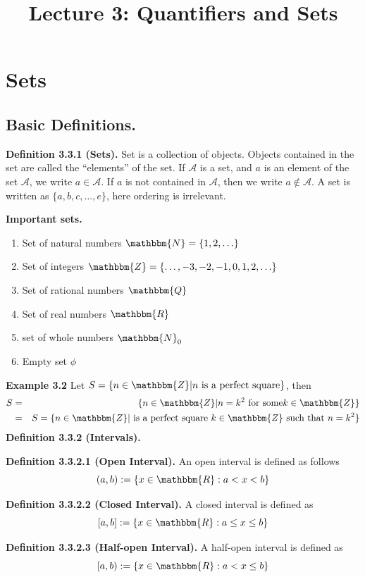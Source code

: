 \documentclass[a4paper,english,12pt]{article}
\title{ Lecture 3: Quantifiers and Sets}
\begin{document}
\maketitle

\section{Sets}
\subsection{Basic Definitions.}
\textbf{Definition 3.3.1 (Sets).} Set is a collection of objects. Objects contained in the set are called the ``elements'' of the set. If $\mathcal{A}$ is a set, and $a$ is an element of the set $\mathcal{A}$, we write $a\in \mathcal{A}$. If $a$ is not contained in $\mathcal{A}$, then we write $a\notin\mathcal{A}$. A set is written as $\{a,b,c,\ldots,e\}$, here ordering is irrelevant. 

\textbf{Important sets.}
\begin{enumerate}
 \item Set of natural numbers $\mathbbm{N} =\{1,2,\ldots\}$
 \item Set of integers $\mathbbm{Z} =\{\ldots,-3,-2,-1,0, 1,2,\ldots\}$
 \item Set of rational numbers $\mathbbm{Q}$
 \item Set of real numbers $\mathbbm{R}$
 \item set of whole numbers $\mathbbm{N}_0$
  \item Empty set $\phi$ 
\end{enumerate}

\textbf{Example 3.2} Let $S=\{n\in \mathbbm{Z}| n \text{ is a perfect square}\}$, then 
\begin{eqnarray*}
 S&=&\{n\in \mathbbm{Z}| n =k^2\text{ for some} k\in \mathbbm{Z}\}\\
 &=&S=\{n\in \mathbbm{Z}| \text{ is a perfect square } k\in \mathbbm{Z} \text{ such that } n=k^2 \}
\end{eqnarray*}
\textbf{Definition 3.3.2 (Intervals).}

\textbf{Definition 3.3.2.1 (Open Interval).} An open interval is defined as follows $$(a,b):= \{x\in \mathbbm{R}: a<x<b\}$$

\textbf{Definition 3.3.2.2 (Closed Interval).} A closed interval is defined as $$[a,b]:= \{x\in \mathbbm{R}: a\leq x\leq b\}$$

\textbf{Definition 3.3.2.3 (Half-open Interval).} A half-open interval is defined as  $$[a,b):= \{x\in \mathbbm{R}: a<x\leq b\}$$
\end{document}
